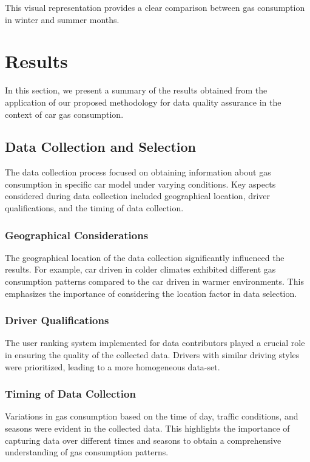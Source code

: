 \documentclass[10pt,a4paper]{article}
\begin{document}
This visual representation provides a clear comparison between gas consumption in winter and summer months.



\section{Results}

In this section, we present a summary of the results obtained from the application of our proposed methodology for data quality assurance in the context of car gas consumption.

\subsection{Data Collection and Selection}

The data collection process focused on obtaining information about gas consumption in specific car model under varying conditions. Key aspects considered during data collection included geographical location, driver qualifications, and the timing of data collection.

\subsubsection{Geographical Considerations}

The geographical location of the data collection significantly influenced the results. For example, car driven in colder climates exhibited different gas consumption patterns compared to the car driven in warmer environments. This emphasizes the importance of considering the location factor in data selection.

\subsubsection{Driver Qualifications}

The user ranking system implemented for data contributors played a crucial role in ensuring the quality of the collected data. Drivers with similar driving styles were prioritized, leading to a more homogeneous data-set.

\subsubsection{Timing of Data Collection}

Variations in gas consumption based on the time of day, traffic conditions, and seasons were evident in the collected data. This highlights the importance of capturing data over different times and seasons to obtain a comprehensive understanding of gas consumption patterns.
\end{document}
